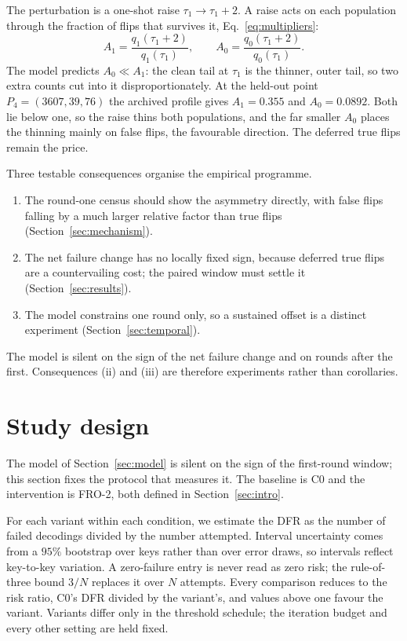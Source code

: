 \documentclass[letterpaper,journal]{IEEEtran}
\begin{document}
The perturbation is a one-shot raise $\tau_1\to\tau_1+2$. A raise acts on each population through the fraction of flips that survives it, Eq.~\eqref{eq:multipliers}:
\begin{equation}\label{eq:multipliers}
A_1=\frac{q_1(\tau_1+2)}{q_1(\tau_1)},\qquad
A_0=\frac{q_0(\tau_1+2)}{q_0(\tau_1)} .
\end{equation}
The model predicts $A_0\ll A_1$: the clean tail at $\tau_1$ is the thinner, outer tail, so two extra counts cut into it disproportionately. At the held-out point $P_4=(3607,39,76)$ the archived profile gives $A_1 = 0.355$ and $A_0 = 0.0892$. Both lie below one, so the raise thins both populations, and the far smaller $A_0$ places the thinning mainly on false flips, the favourable direction. The deferred true flips remain the price.

Three testable consequences organise the empirical programme.
\begin{enumerate}[label=(\roman*),leftmargin=*,itemsep=1pt,topsep=2pt]
\item The round-one census should show the asymmetry directly, with false flips falling by a much larger relative factor than true flips (Section~\ref{sec:mechanism}).
\item The net failure change has no locally fixed sign, because deferred true flips are a countervailing cost; the paired window must settle it (Section~\ref{sec:results}).
\item The model constrains one round only, so a sustained offset is a distinct experiment (Section~\ref{sec:temporal}).
\end{enumerate}
The model is silent on the sign of the net failure change and on rounds after the first. Consequences (ii) and (iii) are therefore experiments rather than corollaries.
\section{Study design}\label{sec:method}

The model of Section~\ref{sec:model} is silent on the sign of the first-round window; this section fixes the protocol that measures it. The baseline is C0 and the intervention is FRO-2, both defined in Section~\ref{sec:intro}.

For each variant within each condition, we estimate the DFR as the number of failed decodings divided by the number attempted. Interval uncertainty comes from a $95\%$ bootstrap over keys rather than over error draws, so intervals reflect key-to-key variation. A zero-failure entry is never read as zero risk; the rule-of-three bound $3/N$ replaces it over $N$ attempts. Every comparison reduces to the risk ratio, C0's DFR divided by the variant's, and values above one favour the variant. Variants differ only in the threshold schedule; the iteration budget and every other setting are held fixed.
\end{document}
